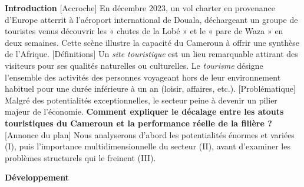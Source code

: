 \documentclass[11pt]{article}
\begin{document}
\begin{corrige}
\textbf{Introduction}
[Accroche] En décembre 2023, un vol charter en provenance d'Europe atterrit à l'aéroport international de Douala, déchargeant un groupe de touristes venus découvrir les « chutes de la Lobé » et le « parc de Waza » en deux semaines. Cette scène illustre la capacité du Cameroun à offrir une synthèse de l'Afrique.
[Définitions] Un \emph{site touristique} est un lieu remarquable attirant des visiteurs pour ses qualités naturelles ou culturelles. Le \emph{tourisme} désigne l'ensemble des activités des personnes voyageant hors de leur environnement habituel pour une durée inférieure à un an (loisir, affaires, etc.).
[Problématique] Malgré des potentialités exceptionnelles, le secteur peine à devenir un pilier majeur de l'économie. \textbf{Comment expliquer le décalage entre les atouts touristiques du Cameroun et la performance réelle de la filière ?}
[Annonce du plan] Nous analyserons d'abord les potentialités énormes et variées (I), puis l'importance multidimensionnelle du secteur (II), avant d'examiner les problèmes structurels qui le freinent (III).

\textbf{Développement}


\end{corrige}
\end{document}

